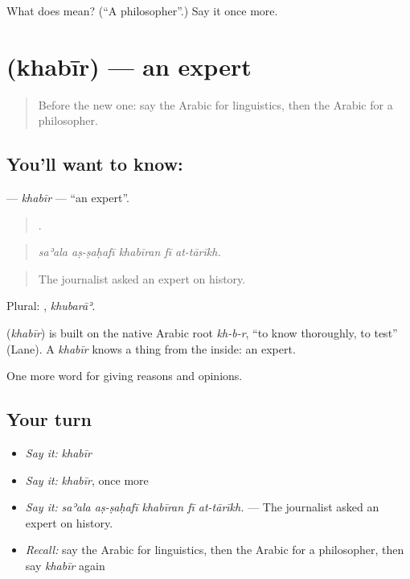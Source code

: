 \begin{tcolorbox}[breakable,colback=teal!4,colframe=teal!35!black,title={Before you move on}]
What does  mean? (\textquotedblleft{}A philosopher\textquotedblright{}.) Say it once more.
\end{tcolorbox}
\section[\texorpdfstring{\ar{خبير} (khabīr)}{خبير (khabīr)}]{ (khabīr) — an expert}

\label{lesson:AR-C376-khabir}



\begin{quote}
Before the new one: say the Arabic for linguistics, then the Arabic for a philosopher.
\end{quote}

\subsection*{You'll want to know: }
\textbf{} — \emph{khabīr} — \textquotedblleft{}an expert\textquotedblright{}.

\begin{quote}
    .
\end{quote}

\begin{quote}
\emph{saʾala aṣ-ṣaḥafī khabīran fī at-tārīkh.}
\end{quote}

\begin{quote}
The journalist asked an expert on history.
\end{quote}

Plural: , \emph{khubarāʾ}.

\begin{cousinweb}
\textbf{} (\emph{khabīr}) is built on the native Arabic root \emph{kh-b-r}, \textquotedblleft{}to know thoroughly, to test\textquotedblright{} (Lane). A \emph{khabīr} knows a thing from the inside: an expert.
\end{cousinweb}

\begin{grammarlens}[title={What you've built}]
One more word for giving reasons and opinions.
\end{grammarlens}

\subsection*{Your turn}
\begin{itemize}
\raggedright
  \item \emph{Say it:} \emph{khabīr}
  \item \emph{Say it:} \emph{khabīr}, once more
  \item \emph{Say it:} \emph{saʾala aṣ-ṣaḥafī khabīran fī at-tārīkh.} — The journalist asked an expert on history.
  \item \emph{Recall:} say the Arabic for linguistics, then the Arabic for a philosopher, then say \emph{khabīr} again
\end{itemize}

